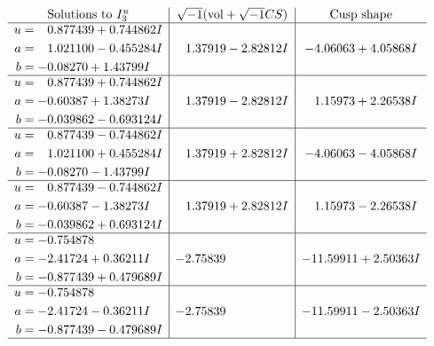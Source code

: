 \documentclass[1p]{elsarticle_modified}
\theoremstyle{definition}
\newcommand{\I}{\sqrt{-1}}
\begin{document}
$$\begin{array}{c|c|c}  
\text{Solutions to }I^u_{3}& \I (\text{vol} + \sqrt{-1}CS) & \text{Cusp shape}\\
 \hline 
\begin{aligned}
u &= \phantom{-}0.877439 + 0.744862 I \\
a &= \phantom{-}1.021100 - 0.455284 I \\
b &= -0.08270 + 1.43799 I\end{aligned}
 & \phantom{-}1.37919 - 2.82812 I & -4.06063 + 4.05868 I \\ \hline\begin{aligned}
u &= \phantom{-}0.877439 + 0.744862 I \\
a &= -0.60387 + 1.38273 I \\
b &= -0.039862 - 0.693124 I\end{aligned}
 & \phantom{-}1.37919 - 2.82812 I & \phantom{-}1.15973 + 2.26538 I \\ \hline\begin{aligned}
u &= \phantom{-}0.877439 - 0.744862 I \\
a &= \phantom{-}1.021100 + 0.455284 I \\
b &= -0.08270 - 1.43799 I\end{aligned}
 & \phantom{-}1.37919 + 2.82812 I & -4.06063 - 4.05868 I \\ \hline\begin{aligned}
u &= \phantom{-}0.877439 - 0.744862 I \\
a &= -0.60387 - 1.38273 I \\
b &= -0.039862 + 0.693124 I\end{aligned}
 & \phantom{-}1.37919 + 2.82812 I & \phantom{-}1.15973 - 2.26538 I \\ \hline\begin{aligned}
u &= -0.754878\phantom{ +0.000000I} \\
a &= -2.41724 + 0.36211 I \\
b &= -0.877439 + 0.479689 I\end{aligned}
 & -2.75839\phantom{ +0.000000I} & -11.59911 + 2.50363 I \\ \hline\begin{aligned}
u &= -0.754878\phantom{ +0.000000I} \\
a &= -2.41724 - 0.36211 I \\
b &= -0.877439 - 0.479689 I\end{aligned}
 & -2.75839\phantom{ +0.000000I} & -11.59911 - 2.50363 I\\
 \hline 
 \end{array}$$\newpage\newpage\renewcommand{\arraystretch}{1}
\end{document}
